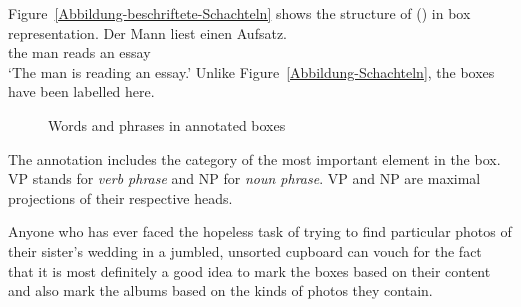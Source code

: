 Figure~\vref{Abbildung-beschriftete-Schachteln} shows the structure of () in box representation.
\ea
\gll Der Mann liest einen Aufsatz.\\
	 the man reads an essay\\
\glt `The man is reading an essay.'
\z
Unlike Figure~\ref{Abbildung-Schachteln}, the boxes have been labelled here.
\begin{figure}
\centering
{}
\caption{\label{Abbildung-beschriftete-Schachteln}Words and phrases in annotated boxes}
\end{figure}%


The annotation includes the category of the most important element in the box. VP stands for \emph{verb phrase} and NP for \emph{noun phrase}. VP and NP are maximal projections of
their respective heads.

Anyone who has ever faced the hopeless task of trying to find particular photos of their sister's wedding in a jumbled, unsorted cupboard can vouch for the fact that it is most definitely a good idea
to mark the boxes based on their content and also mark the albums based on the kinds of photos they contain.

